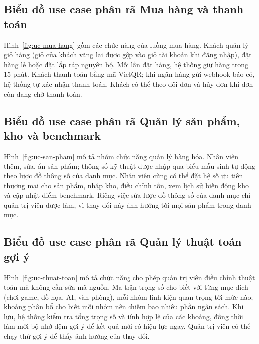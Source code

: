 \subsection{Biểu đồ use case phân rã Mua hàng và thanh toán}


Hình~\ref{fig:uc-mua-hang} gồm các chức năng của luồng mua hàng. Khách quản lý giỏ hàng (giỏ của khách vãng lai được gộp vào giỏ tài khoản khi đăng nhập), đặt hàng lẻ hoặc đặt lắp ráp nguyên bộ. Mỗi lần đặt hàng, hệ thống giữ hàng trong 15 phút. Khách thanh toán bằng mã VietQR; khi ngân hàng gửi webhook báo có, hệ thống tự xác nhận thanh toán. Khách có thể theo dõi đơn và hủy đơn khi đơn còn đang chờ thanh toán.

\subsection{Biểu đồ use case phân rã Quản lý sản phẩm, kho và benchmark}


Hình~\ref{fig:uc-san-pham} mô tả nhóm chức năng quản lý hàng hóa. Nhân viên thêm, sửa, ẩn sản phẩm; thông số kỹ thuật được nhập qua biểu mẫu sinh tự động theo lược đồ thông số của danh mục. Nhân viên cũng có thể đặt hệ số ưu tiên thương mại cho sản phẩm, nhập kho, điều chỉnh tồn, xem lịch sử biến động kho và cập nhật điểm benchmark. Riêng việc sửa lược đồ thông số của danh mục chỉ quản trị viên được làm, vì thay đổi này ảnh hưởng tới mọi sản phẩm trong danh mục.

\subsection{Biểu đồ use case phân rã Quản lý thuật toán gợi ý}


Hình~\ref{fig:uc-thuat-toan} mô tả chức năng cho phép quản trị viên điều chỉnh thuật toán mà không cần sửa mã nguồn. Ma trận trọng số cho biết với từng mục đích (chơi game, đồ họa, AI, văn phòng), mỗi nhóm linh kiện quan trọng tới mức nào; khoảng phân bổ cho biết mỗi nhóm nên chiếm bao nhiêu phần ngân sách. Khi lưu, hệ thống kiểm tra tổng trọng số và tính hợp lệ của các khoảng, đồng thời làm mới bộ nhớ đệm gợi ý để kết quả mới có hiệu lực ngay. Quản trị viên có thể chạy thử gợi ý để thấy ảnh hưởng của thay đổi.

